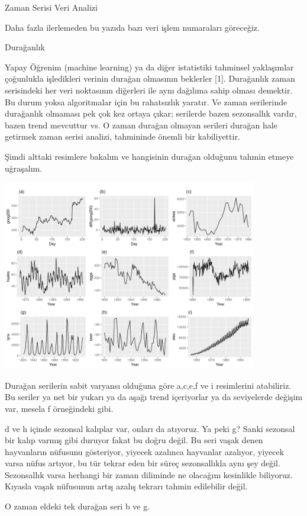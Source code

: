 \documentclass[12pt,fleqn]{article}\usepackage{../../common}
\begin{document}
Zaman Serisi Veri Analizi

Daha fazla ilerlemeden bu yazıda bazı veri işlem numaraları göreceğiz.

Durağanlık

Yapay Öğrenim (machine learning) ya da diğer istatistiki tahminsel yaklaşımlar
çoğunlukla işledikleri verinin durağan olmasının beklerler [1]. Durağanlık zaman
serisindeki her veri noktasının diğerleri ile aynı dağılıma sahip olması
demektir. Bu durum yoksa algoritmalar için bu rahatsızlık yaratır. Ve zaman
serilerinde durağanlık olmaması pek çok kez ortaya çıkar; serilerde bazen
sezonsallık vardır, bazen trend mevcuttur vs. O zaman durağan olmayan serileri
durağan hale getirmek zaman serisi analizi, tahmininde önemli bir kabiliyettir.

Şimdi alttaki resimlere bakalım ve hangisinin durağan olduğunu tahmin etmeye
uğraşalım. 

\includegraphics[width=30em]{tser_008_data_01.png}

Durağan serilerin sabit varyansı olduğuna göre a,c,e,f ve i resimlerini
atabiliriz. Bu seriler ya net bir yukarı ya da aşağı trend içeriyorlar ya
da seviyelerde değişim var, mesela f örneğindeki gibi.

d ve h içinde sezonsal kalıplar var, onları da atıyoruz. Ya peki g?  Sanki
sezonsal bir kalıp varmış gibi duruyor fakat bu doğru değil. Bu seri vaşak denen
hayvanların nüfusunu gösteriyor, yiyecek azalınca hayvanlar azalıyor, yiyecek
varsa nüfus artıyor, bu tür tekrar eden bir süreç sezonsallıkla aynı şey
değil. Sezonsallık varsa herhangi bir zaman diliminde ne olacağını kesinlikle
biliyoruz. Kıyasla vaşak nüfusunun artış azalış tekrarı tahmin edilebilir değil.

O zaman eldeki tek durağan seri b ve g.
\end{document}
